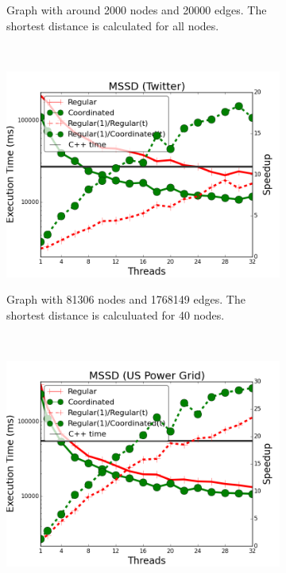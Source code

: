 \begin{figure}[]
\begin{subfigure}[b]{\plotsize\textwidth}
                \caption{Graph with around 2000 nodes and 20000 edges. The shortest
                   distance is calculated for all nodes.}
        \end{subfigure} \\
        \begin{subfigure}[b]{\plotsize\textwidth}
                \includegraphics[width=\textwidth]{experiments/coordination/cmp-shortest-twitter.png}
                \label{fig:coordination:coord_sssp_twitter}
                \caption{Graph with 81306 nodes and 1768149 edges. The shortest
                   distance is calculuated for 40 nodes.}
        \end{subfigure}
        ~
        \begin{subfigure}[b]{\plotsize\textwidth}
                \includegraphics[width=\textwidth]{experiments/coordination/cmp-shortest-uspowergrid.png}

\end{subfigure}
\end{figure}

